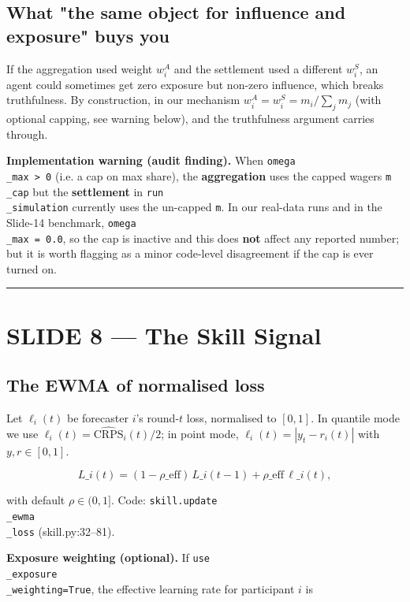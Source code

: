 \documentclass[11pt]{article}
\begin{document}
\subsection{What "the same object for influence and exposure" buys you}


If the aggregation used weight $w_i^A$ and the settlement used a different $w_i^S$, an agent could sometimes get zero exposure but non-zero influence, which breaks truthfulness. By construction, in our mechanism $w_i^A = w_i^S = m_i/\sum_j m_j$ (with optional capping, see warning below), and the truthfulness argument carries through.

\textbf{Implementation warning (audit finding).} When \texttt{omega\\_max > 0} (i.e. a cap on max share), the \textbf{aggregation} uses the capped wagers \texttt{m\\_cap} but the \textbf{settlement} in \texttt{run\\_simulation} currently uses the un-capped \texttt{m}. In our real-data runs and in the Slide-14 benchmark, \texttt{omega\\_max = 0.0}, so the cap is inactive and this does \textbf{not} affect any reported number; but it is worth flagging as a minor code-level disagreement if the cap is ever turned on.

\bigskip\hrule\bigskip

\section{SLIDE 8 --- The Skill Signal}


\subsection{The EWMA of normalised loss}


Let $\ell_i(t)$ be forecaster $i$'s round-$t$ loss, normalised to $[0,1]$. In quantile mode we use $\ell_i(t) = \widehat{\text{CRPS}}_i(t)/2$; in point mode, $\ell_i(t) = |y_t - r_i(t)|$ with $y, r \in [0,1]$.

$$
L\_i(t) = (1 - \rho\_{\text{eff}})\,L\_i(t-1) + \rho\_{\text{eff}}\,\ell\_i(t),
$$

with default $\rho \in (0, 1]$. Code: \texttt{skill.update\\_ewma\\_loss} (skill.py:32--81).

\textbf{Exposure weighting (optional).} If \texttt{use\\_exposure\\_weighting=True}, the effective learning rate for participant $i$ is
\end{document}
